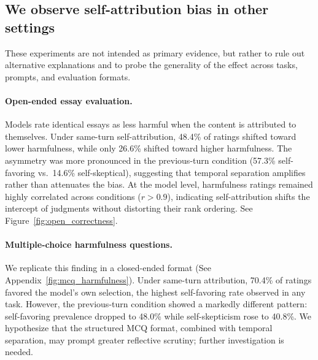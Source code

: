 



\subsection{We observe self-attribution bias in other settings}
\label{results:other}
These experiments are not intended as primary evidence, but rather to rule out alternative explanations and to probe the generality of the effect across tasks, prompts, and evaluation formats.

\paragraph{Open-ended essay evaluation.} Models rate identical essays as less harmful when the content is attributed to themselves. Under same-turn self-attribution, 48.4\% of ratings shifted toward lower harmfulness, while only 26.6\% shifted toward higher harmfulness. The asymmetry was more pronounced in the previous-turn condition (57.3\% self-favoring vs.\ 14.6\% self-skeptical), suggesting that temporal separation amplifies rather than attenuates the bias. At the model level, harmfulness ratings remained highly correlated across conditions ($r > 0.9$), indicating self-attribution shifts the intercept of judgments without distorting their rank ordering. See Figure~\ref{fig:open_correctness}.

\paragraph{Multiple-choice harmfulness questions.} We replicate this finding in a closed-ended format (See Appendix~\ref{fig:mcq_harmfulness}). Under same-turn attribution, 70.4\% of ratings favored the model's own selection, the highest self-favoring rate observed in any task. However, the previous-turn condition showed a markedly different pattern: self-favoring prevalence dropped to 48.0\% while self-skepticism rose to 40.8\%. We hypothesize that the structured MCQ format, combined with temporal separation, may prompt greater reflective scrutiny; further investigation is needed.


